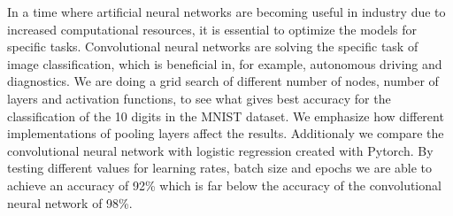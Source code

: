 In a time where artificial neural networks are becoming useful in industry due to increased computational resources, it is essential to optimize the models for specific tasks. Convolutional neural networks are solving the specific task of image classification, which is beneficial in, for example, autonomous driving and diagnostics. We are doing a grid search of different number of nodes, number of layers and activation functions, to see what gives best accuracy for the classification of the 10 digits in the MNIST dataset. We emphasize how different implementations of pooling layers affect the results. Additionaly we compare the convolutional neural network with logistic regression created with Pytorch. By testing different values for learning rates, batch size and epochs we are able to achieve an accuracy of 92\% which is far below the accuracy of the convolutional neural network of 98\%. 